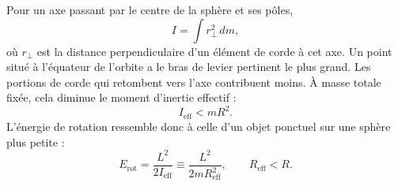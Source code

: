 Pour un axe passant par le centre de la sphère et ses pôles,
\begin{equation}
  I=\int r_\perp^2\,dm,
  \label{eq:l09-extended-inertia}
\end{equation}
où \(r_\perp\) est la distance perpendiculaire d’un élément de corde à cet axe. Un point situé à l’équateur de l’orbite a le bras de levier pertinent le plus grand. Les portions de corde qui retombent vers l’axe contribuent moins. À masse totale fixée, cela diminue le moment d’inertie effectif :
\begin{equation}
  I_{\mathrm{eff}}<mR^2.
  \label{eq:l09-inertia-reduction}
\end{equation}
L’énergie de rotation ressemble donc à celle d’un objet ponctuel sur une sphère plus petite :
\begin{equation}
  E_{\mathrm{rot}}
  =\frac{L^2}{2I_{\mathrm{eff}}}
  \equiv \frac{L^2}{2mR_{\mathrm{eff}}^2},
  \qquad R_{\mathrm{eff}}<R.
  \label{eq:l09-effective-radius}
\end{equation}

\begin{classroomqa}
\end{classroomqa}


